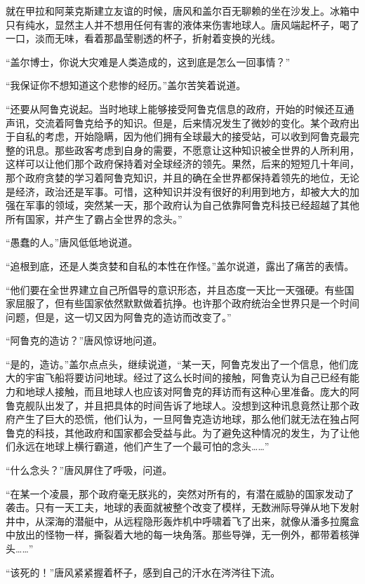 就在甲拉和阿莱克斯建立友谊的时候，唐风和盖尔百无聊赖的坐在沙发上。冰箱中只有纯水，显然主人并不想用任何有害的液体来伤害地球人。唐风端起杯子，喝了一口，淡而无味，看着那晶莹剔透的杯子，折射着变换的光线。

“盖尔博士，你说大灾难是人类造成的，这到底是怎么一回事情？”

“我保证你不想知道这个悲惨的经历。”盖尔苦笑着说道。

“还要从阿鲁克说起。当时地球上能够接受阿鲁克信息的政府，开始的时候还互通声讯，交流着阿鲁克给予的知识。但是，后来情况发生了微妙的变化。某个政府出于自私的考虑，开始隐瞒，因为他们拥有全球最大的接受站，可以收到阿鲁克最完整的讯息。那些政客考虑到自身的需要，不愿意让这种知识被全世界的人所利用，这样可以让他们那个政府保持着对全球经济的领先。果然，后来的短短几十年间，那个政府贪婪的学习着阿鲁克知识，并且的确在全世界都保持着领先的地位，无论是经济，政治还是军事。可惜，这种知识并没有很好的利用到地方，却被大大的加强在军事的领域，突然某一天，那个政府认为自己依靠阿鲁克科技已经超越了其他所有国家，并产生了霸占全世界的念头。”

“愚蠢的人。”唐风低低地说道。

“追根到底，还是人类贪婪和自私的本性在作怪。”盖尔说道，露出了痛苦的表情。

“他们要在全世界建立自己所倡导的意识形态，并且态度一天比一天强硬。有些国家屈服了，但有些国家依然默默做着抗挣。也许那个政府统治全世界只是一个时间问题，但是，这一切又因为阿鲁克的造访而改变了。”

“阿鲁克的造访？”唐风惊讶地问道。

“是的，造访。”盖尔点点头，继续说道，“某一天，阿鲁克发出了一个信息，他们庞大的宇宙飞船将要访问地球。经过了这么长时间的接触，阿鲁克认为自己已经有能力和地球人接触，而且地球人也应该对阿鲁克的拜访而有这种心里准备。庞大的阿鲁克舰队出发了，并且把具体的时间告诉了地球人。没想到这种讯息竟然让那个政府产生了巨大的恐慌，他们认为，一旦阿鲁克造访地球，那么他们就无法在独占阿鲁克的科技，其他政府和国家都会受益与此。为了避免这种情况的发生，为了让他们永远在地球上横行霸道，他们产生了一个最可怕的念头……”

“什么念头？”唐风屏住了呼吸，问道。

“在某一个凌晨，那个政府毫无朕兆的，突然对所有的，有潜在威胁的国家发动了袭击。只有一天工夫，地球的表面就被整个改变了模样，无数洲际导弹从地下发射井中，从深海的潜艇中，从远程隐形轰炸机中呼啸着飞了出来，就像从潘多拉魔盒中放出的怪物一样，撕裂着大地的每一块角落。那些导弹，无一例外，都带着核弹头……”

“该死的！”唐风紧紧握着杯子，感到自己的汗水在涔涔往下流。

